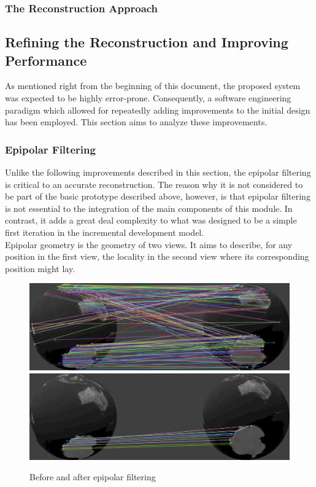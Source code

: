 \documentclass[12pt,a4paper,twoside,openright]{report}
\begin{document}
\subsubsection{The Reconstruction Approach}

\subsection{Refining the Reconstruction and Improving Performance}
As mentioned right from the beginning of this document, the proposed system was expected to be highly error-prone. Consequently, a software engineering paradigm which allowed for repeatedly adding improvements to the initial design has been employed. This section aims to analyze these improvements.
\subsubsection{Epipolar Filtering}
Unlike the following improvements described in this section, the epipolar filtering is critical to an accurate reconstruction. The reason why it is not considered to be part of the basic prototype described above, however, is that epipolar filtering is not essential to the integration of the main components of this module. In contrast, it adds a great deal complexity to what was designed to be a simple first iteration in the incremental development model.\\
Epipolar geometry is the geometry of two views. It aims to describe, for any position in the first view, the locality in the second view where its corresponding position might lay.\\
\begin{figure}
\begin{center}
\includegraphics[scale=0.35]{figs/before_epi.png} \\
\vspace{5pt}
\includegraphics[scale=0.35]{figs/after_epi.png}	
\caption{Before and after epipolar filtering}
\end{center}
\end{figure}
\end{document}
